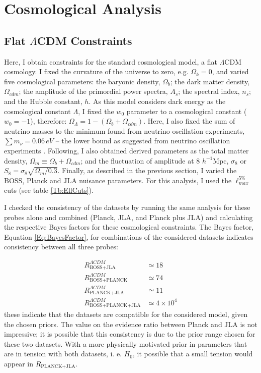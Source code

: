\section{Cosmological Analysis}\label{Sec:CosmoAnal}
\subsection{Flat $\Lambda$CDM Constraints}\label{Sec:LCDM}
Here, I obtain constraints for the standard cosmological model, a flat $\Lambda$CDM cosmology. I fixed the curvature of the universe to zero, e.g. $\Omega_k = 0$, and varied five cosmological parameters: the baryonic density, $\Omega_b$; the dark matter density, $\Omega_{cdm}$; the amplitude of the primordial power spectra, $A_s$; the spectral index, $n_s$; and the Hubble constant, $h$. As this model considers dark energy as the cosmological constant $\Lambda$, I fixed the $w_0$ parameter to a cosmological constant ($w_0 = -1$), therefore: $\Omega_{\Lambda} = 1 - (\Omega_b + \Omega_{cdm})$. Here, I also fixed the sum of neutrino masses to the minimum found from neutrino oscillation experiments, $\sum m_{\nu} = 0.06 \, eV$ -- the lower bound as suggested from neutrino oscillation experiments \citep{2006NeutrinoReview,2014NeutrinoCosmoPlanck}. Following, I also obtained derived parameters as the total matter density, $\Omega_m \equiv \Omega_b + \Omega_{cdm}$; and the fluctuation of amplitude at 8 $h^{-1}$Mpc, $\sigma_8$ or $S_8 = \sigma_8\sqrt{\Omega_m/0.3}$. Finally, as described in the previous section, I varied the BOSS, Planck and JLA nuisance parameters. For this analysis, I used the $\ell_{max}^{5\%}$ cuts (see table \ref{Tb:EllCuts}).

\qquad I checked the consistency of the datasets by running the same analysis for these probes alone and combined (Planck, JLA, and Planck plus JLA) and calculating the respective Bayes factors for these cosmological constraints. The Bayes factor, Equation \eqref{Eq:BayesFactor},  for combinations of the considered datasets indicates consistency between all three probes:

\begin{align}
R_{\scriptscriptstyle\text{BOSS+JLA}}^{\Lambda CDM} & \simeq 18  \\
R_{\scriptscriptstyle\text{BOSS+PLANCK}}^{\Lambda CDM} & \simeq 74 \\
R_{\scriptscriptstyle\text{PLANCK+JLA}}^{\Lambda CDM} & \simeq 11 \\
R_{\scriptscriptstyle\text{BOSS+PLANCK+JLA}}^{\Lambda CDM} & \simeq 4 \times 10^4
\end{align}
these indicate that the datasets are compatible for the considered model, given the chosen priors. The value on the evidence ratio between Planck and JLA is not impressive; it is possible that this consistency is due to the prior range chosen for these two datasets. With a more physically motivated prior in parameters that are in tension with both datasets, i. e. $H_0$, it possible that a small tension would appear in $R_{\scriptscriptstyle\text{PLANCK+JLA}}$. 

